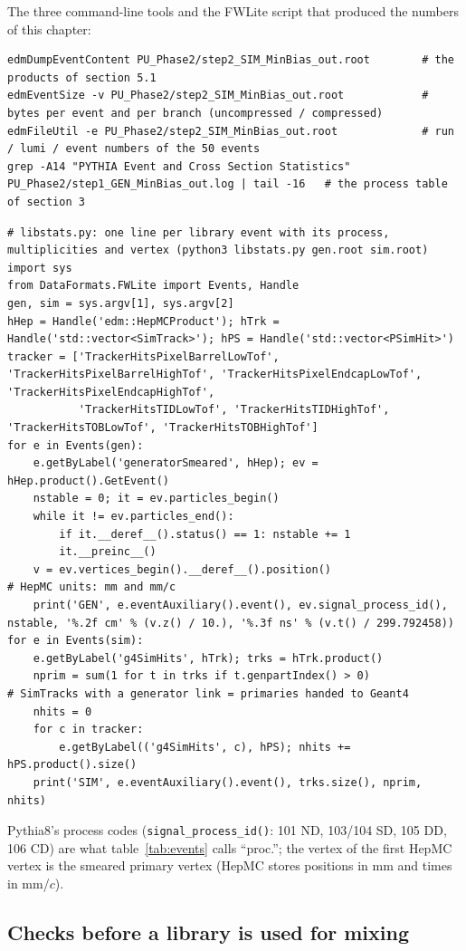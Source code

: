 \documentclass[11pt,a4paper]{article}
\newcommand{\code}[1]{\texttt{#1}}
\begin{document}
The three command-line tools and the FWLite script that produced the numbers of this chapter:
\begin{lstlisting}[style=sh]
edmDumpEventContent PU_Phase2/step2_SIM_MinBias_out.root        # the products of section 5.1
edmEventSize -v PU_Phase2/step2_SIM_MinBias_out.root            # bytes per event and per branch (uncompressed / compressed)
edmFileUtil -e PU_Phase2/step2_SIM_MinBias_out.root             # run / lumi / event numbers of the 50 events
grep -A14 "PYTHIA Event and Cross Section Statistics" PU_Phase2/step1_GEN_MinBias_out.log | tail -16   # the process table of section 3
\end{lstlisting}
\begin{lstlisting}[style=py]
# libstats.py: one line per library event with its process, multiplicities and vertex (python3 libstats.py gen.root sim.root)
import sys
from DataFormats.FWLite import Events, Handle
gen, sim = sys.argv[1], sys.argv[2]
hHep = Handle('edm::HepMCProduct'); hTrk = Handle('std::vector<SimTrack>'); hPS = Handle('std::vector<PSimHit>')
tracker = ['TrackerHitsPixelBarrelLowTof', 'TrackerHitsPixelBarrelHighTof', 'TrackerHitsPixelEndcapLowTof', 'TrackerHitsPixelEndcapHighTof',
           'TrackerHitsTIDLowTof', 'TrackerHitsTIDHighTof', 'TrackerHitsTOBLowTof', 'TrackerHitsTOBHighTof']
for e in Events(gen):
    e.getByLabel('generatorSmeared', hHep); ev = hHep.product().GetEvent()
    nstable = 0; it = ev.particles_begin()
    while it != ev.particles_end():
        if it.__deref__().status() == 1: nstable += 1
        it.__preinc__()
    v = ev.vertices_begin().__deref__().position()                       # HepMC units: mm and mm/c
    print('GEN', e.eventAuxiliary().event(), ev.signal_process_id(), nstable, '%.2f cm' % (v.z() / 10.), '%.3f ns' % (v.t() / 299.792458))
for e in Events(sim):
    e.getByLabel('g4SimHits', hTrk); trks = hTrk.product()
    nprim = sum(1 for t in trks if t.genpartIndex() > 0)                 # SimTracks with a generator link = primaries handed to Geant4
    nhits = 0
    for c in tracker:
        e.getByLabel(('g4SimHits', c), hPS); nhits += hPS.product().size()
    print('SIM', e.eventAuxiliary().event(), trks.size(), nprim, nhits)
\end{lstlisting}
Pythia8's process codes (\code{signal\_process\_id()}: 101 ND, 103/104 SD, 105 DD, 106 CD) are what
table~\ref{tab:events} calls ``proc.''; the vertex of the first HepMC vertex is the smeared primary vertex
(HepMC stores positions in mm and times in mm/$c$).

\subsection{Checks before a library is used for mixing}
\end{document}
